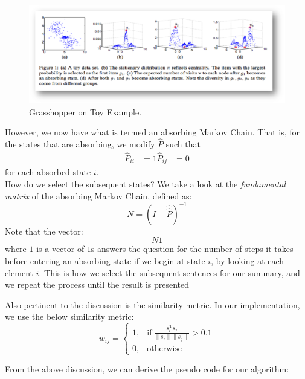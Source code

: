 \documentclass[10pt]{article}
\begin{document}
\begin{figure}[h!]
\centering
\includegraphics[scale=0.4]{grasshopper}
\caption{Grasshopper on Toy Example.}
\label{fig:grasshopper}
\end{figure}

However, we now have what is termed an absorbing Markov Chain. That is, for the states that are absorbing, we modify $\hat{P}$ such that
\begin{align*}
\hat{P}_{ii} &= 1
\hat{P}_{ij} &= 0 \tag{$i \neq j$}
\end{align*}
for each absorbed state $i$. \\

How do we select the subsequent states? We take a look at the \textit{fundamental matrix} of the absorbing Markov Chain, defined as:
$$
N = (I - \hat{\hat{P}})^{-1}
$$
Note that the vector:
$$
N 1
$$
where $1$ is a vector of $1$s answers the question for the number of steps it takes before entering an absorbing state if we begin at state $i$, by looking at each element $i$. This is how we select the subsequent sentences for our summary, and we repeat the process until the result is presented


Also pertinent to the discussion is the similarity metric. In our implementation, we use the below similarity metric:
  \begin{equation}
    w_{ij} =
    \begin{cases}
      1, & \text{if}\ \frac{s_{i}^\text{T}s_j}{\|s_i\| \|s_j\|} > 0.1 \\
      0, & \text{otherwise}
    \end{cases}
  \end{equation}


From the above discussion, we can derive the pseudo code for our algorithm:
\end{document}
